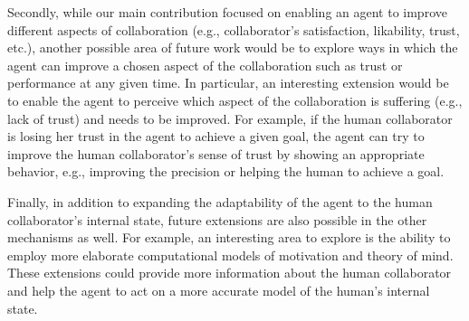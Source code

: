 \documentclass[12pt]{report}
\begin{document}
Secondly, while our main contribution focused on enabling an agent to
improve different aspects of collaboration (e.g., collaborator's satisfaction,
likability, trust, etc.), another possible area of future work would be to
explore ways in which the agent can improve a chosen aspect of the collaboration
such as trust or performance at any given time. In particular, an interesting
extension would be to enable the agent to perceive which aspect of the
collaboration is suffering (e.g., lack of trust) and needs to be improved. For
example, if the human collaborator is losing her trust in the agent to achieve a
given goal, the agent can try to improve the human collaborator's sense of trust
by showing an appropriate behavior, e.g., improving the precision or helping the
human to achieve a goal.

Finally, in addition to expanding the adaptability of the agent to the human
collaborator's internal state, future extensions are also possible in the other
mechanisms as well. For example, an interesting area to explore is the ability
to employ more elaborate computational models of motivation and theory of mind.
These extensions could provide more information about the human collaborator and
help the agent to act on a more accurate model of the human's internal state.

\pagebreak



\end{document}

